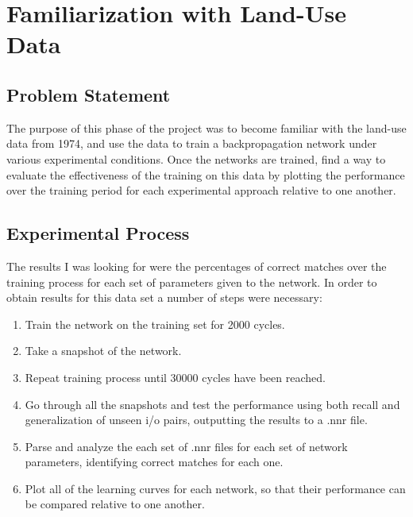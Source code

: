 \documentclass[12pt]{article}
\begin{document}
\maketitle

\section{Familiarization with Land-Use Data}

\subsection{Problem Statement}

The purpose of this phase of the project was to become familiar with the land-use data from 1974, and use the data to train a backpropagation network under various experimental conditions.  Once the networks are trained, find a way to evaluate the effectiveness of the training on this data by plotting the performance over the training period for each experimental approach relative to one another.

\subsection{Experimental Process}

The results I was looking for were the percentages of correct matches over the training process for each set of parameters given to the network.  In order to obtain results for this data set a number of steps were necessary:

\begin{enumerate}
\item Train the network on the training set for 2000 cycles.
\item Take a snapshot of the network.
\item Repeat training process until 30000 cycles have been reached.
\item Go through all the snapshots and test the performance using both recall and generalization of unseen i/o pairs, outputting the results to a .nnr file.
\item Parse and analyze the each set of .nnr files for each set of network parameters, identifying correct matches for each one.
\item Plot all of the learning curves for each network, so that their performance can be compared relative to one another.
\end{enumerate}
\end{document}

